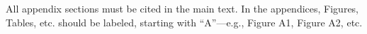 \documentclass[preprints,article,submit,pdftex,moreauthors]{Definitions/mdpi}
\begin{document}
\section[\appendixname~\thesection]{}
All appendix sections must be cited in the main text. In the appendices, Figures, Tables, etc. should be labeled, starting with ``A''---e.g., Figure A1, Figure A2, etc.

\isPreprints{}{%
\begin{adjustwidth}{-\extralength}{0cm}
} %



% 

\end{document}
